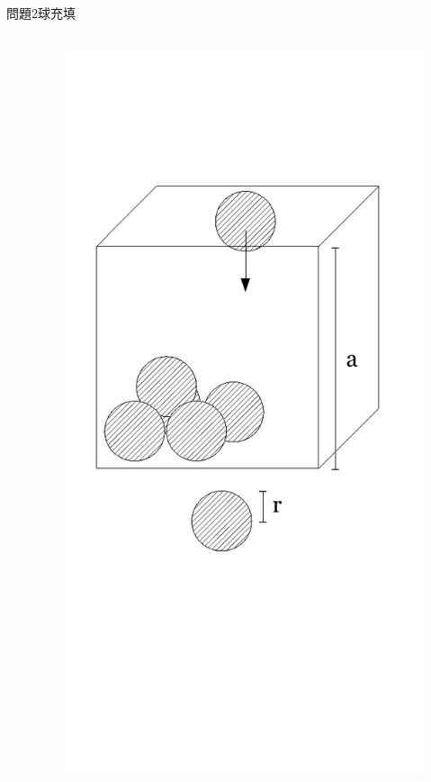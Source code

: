 \documentclass[dvipdfmx]{beamer}
\begin{document}
\begin{frame}{問題2}{球充填}
\begin{columns}[t]
\begin{column}{0.7\textwidth}
\end{column}
\begin{column}{0.3\textwidth}
\begin{figure}[htbp]
    \centering
    \includegraphics[bb=0mm 0mm 100.0mm 170.0mm, scale=0.35, type=pdf]{img/problem2.pdf}
\end{figure}
\end{column}
\end{columns}
\end{frame}
\end{document}

